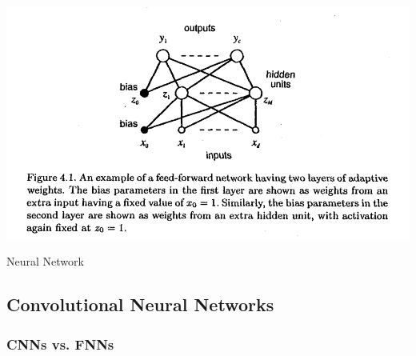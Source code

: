 \documentclass[12pt]{article}
\begin{document}
            
            \begin{table}[ht]
            
                \begin{center}

                    \includegraphics[scale=1]{neural-network-bishop.png}
                    \caption{Neural Network \cite{bishop1995}}
                    \label{nn-bishop}
        
                \end{center}
                
            \end{table}

          

        \subsection{Convolutional Neural Networks}

           \subsubsection{CNNs vs. FNNs}
\end{document}
